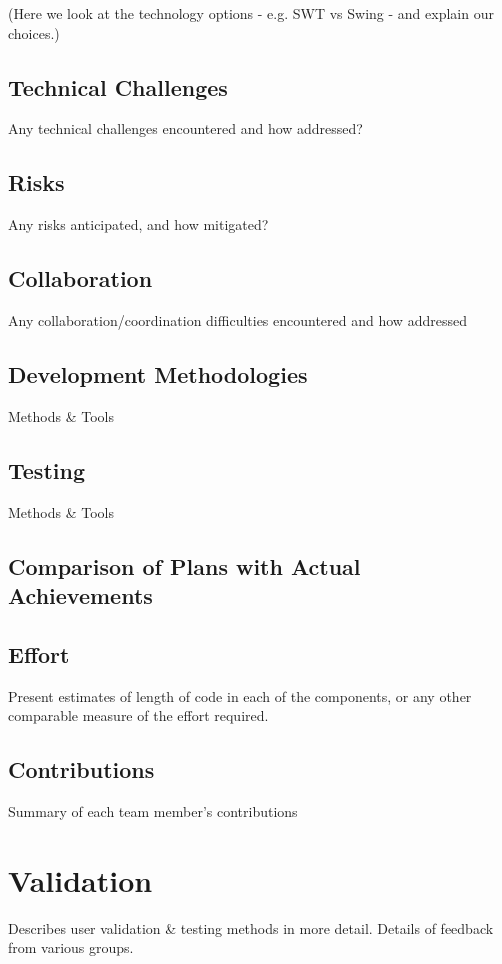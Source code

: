 \documentclass[10pt]{report}
\begin{document}
(Here we look at the technology options - e.g. SWT vs Swing - and explain our choices.)

\section{Technical Challenges}
Any technical challenges encountered and how addressed?

\section{Risks}
Any risks anticipated, and how mitigated?

\section{Collaboration}
Any collaboration/coordination difficulties encountered and how addressed 

\section{Development Methodologies}
Methods \& Tools

\section{Testing}
Methods \& Tools

\section{Comparison of Plans with Actual Achievements }

\section{Effort}
Present estimates of length of code in each of the components, or any other comparable measure of the effort required.

\section{Contributions}
Summary of each team member's contributions 


\chapter{Validation}
Describes user validation \& testing methods in more detail.
Details of feedback from various groups.
\end{document}
